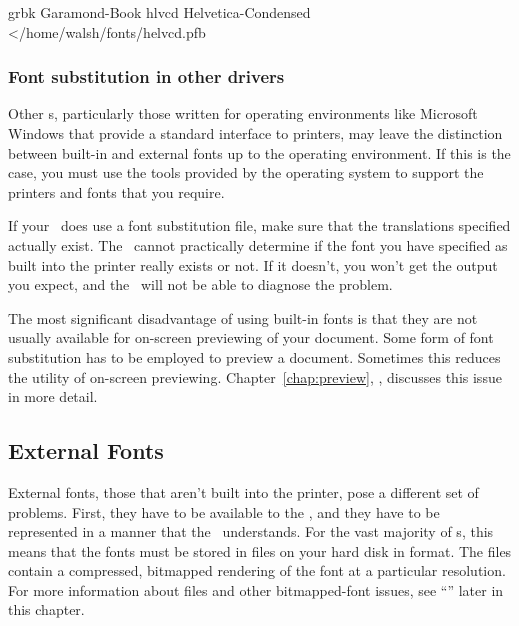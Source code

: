 \begin{shortexample}
grbk   Garamond-Book
hlvcd  Helvetica-Condensed </home/walsh/fonts/helvcd.pfb
\end{shortexample}

\subsubsection{Font substitution in other drivers}

Other \dvidriver{}s, particularly those written for operating environments
like Microsoft Windows that
provide a standard interface to printers, may
leave the distinction between built-in and external fonts up to the
operating environment.  If this is the case, you must use the tools
provided by the operating system 
to support the printers and fonts that you require.

If your \dvidriver\ does use a font substitution file, 
make sure that the translations specified actually exist.  The
\dvidriver\ cannot practically determine if the font you have
specified as built into the printer really exists or not.  If it
doesn't, you won't get the output you expect, and the \dvidriver\ will
not be able to diagnose the problem.

The most significant disadvantage of using built-in fonts is that they
are not usually available for on-screen previewing of your document.
Some form of font substitution has to be employed to 
preview a document.  Sometimes this reduces the utility of on-screen
previewing.  Chapter~\ref{chap:preview}, {\it {}},
discusses this issue in more detail.

\subsection{External Fonts}

External fonts, those 
that aren't built into the printer, pose a
different set of problems.  First, they have to be available to the
\dvidriver, and they have to be represented in a manner that the
\dvidriver\ understands.  For the vast majority of \dvidriver{}s, this
means that the fonts must be stored in files on your hard disk in
 format.  The  files contain a compressed,
bitmapped rendering of the font at a particular resolution.  For more
information about  files and other bitmapped-font issues, see
``'' later in this chapter.

